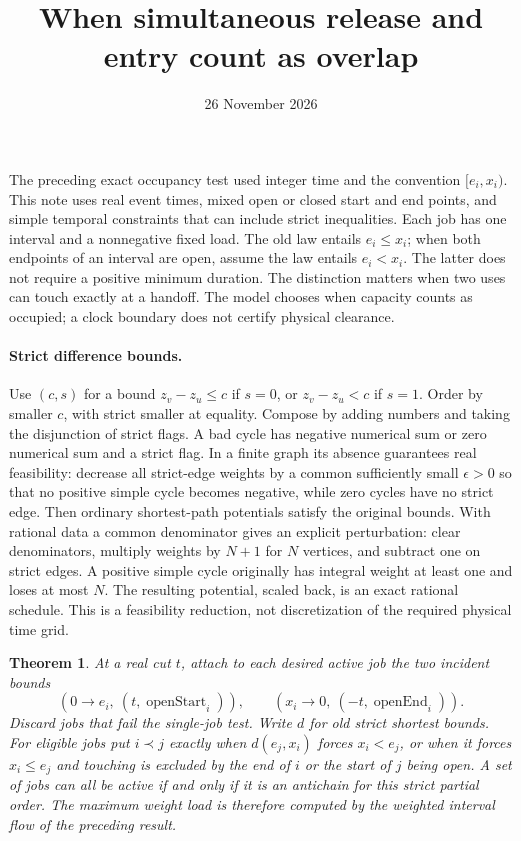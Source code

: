 \documentclass[11pt]{article}
\title{When simultaneous release and entry count as overlap}
\author{}
\date{26 November 2026}
\newtheorem{theorem}{Theorem}
\begin{document}
\maketitle

The preceding exact occupancy test used integer time and the convention $[e_i,x_i)$. This note uses real event times, mixed open or closed start and end points, and simple temporal constraints that can include strict inequalities. Each job has one interval and a nonnegative fixed load. The old law entails $e_i\le x_i$; when both endpoints of an interval are open, assume the law entails $e_i<x_i$. The latter does not require a positive minimum duration. The distinction matters when two uses can touch exactly at a handoff. The model chooses when capacity counts as occupied; a clock boundary does not certify physical clearance.

\paragraph{Strict difference bounds.}
Use $(c,s)$ for a bound $z_v-z_u\le c$ if $s=0$, or $z_v-z_u<c$ if $s=1$. Order by smaller $c$, with strict smaller at equality. Compose by adding numbers and taking the disjunction of strict flags. A bad cycle has negative numerical sum or zero numerical sum and a strict flag. In a finite graph its absence guarantees real feasibility: decrease all strict-edge weights by a common sufficiently small $\epsilon>0$ so that no positive simple cycle becomes negative, while zero cycles have no strict edge. Then ordinary shortest-path potentials satisfy the original bounds. With rational data a common denominator gives an explicit perturbation: clear denominators, multiply weights by $N+1$ for $N$ vertices, and subtract one on strict edges. A positive simple cycle originally has integral weight at least one and loses at most $N$. The resulting potential, scaled back, is an exact rational schedule. This is a feasibility reduction, not discretization of the required physical time grid.

\begin{theorem}
At a real cut $t$, attach to each desired active job the two incident bounds
\[
 (0\to e_i,\ (t,\operatorname{openStart}_i)),\qquad
 (x_i\to0,\ (-t,\operatorname{openEnd}_i)).
\]
Discard jobs that fail the single-job test. Write $d$ for old strict shortest bounds. For eligible jobs put $i\prec j$ exactly when $d(e_j,x_i)$ forces $x_i<e_j$, or when it forces $x_i\le e_j$ and touching is excluded by the end of $i$ or the start of $j$ being open. A set of jobs can all be active if and only if it is an antichain for this strict partial order. The maximum weight load is therefore computed by the weighted interval flow of the preceding result.
\end{theorem}
\end{document}
